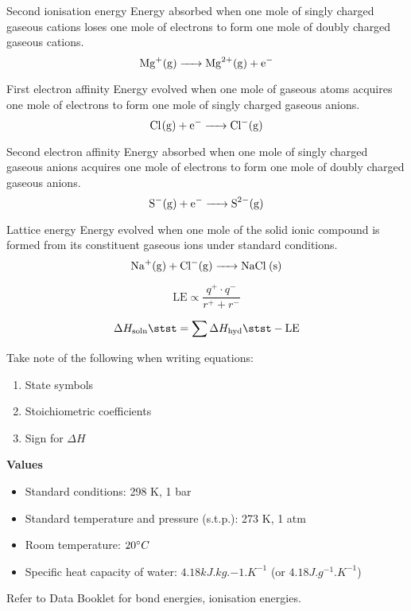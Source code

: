 \begin{defn}{Second ionisation energy}{}
Energy absorbed when one mole of singly charged gaseous cations loses one mole of electrons to form one mole of doubly charged gaseous cations.
\[ \ce{Mg^+(g) -> Mg^2+(g) + e^-} \]
\end{defn}

\begin{defn}{First electron affinity}{}
Energy evolved when one mole of gaseous atoms acquires one mole of electrons to form one mole of singly charged gaseous anions.
\[ \ce{Cl(g) + e^- -> Cl^-(g)} \]
\end{defn}

\begin{defn}{Second electron affinity}{}
Energy absorbed when one mole of singly charged gaseous anions acquires one mole of electrons to form one mole of doubly charged gaseous anions.
\[ \ce{S^-(g) + e^- -> S^2-(g)} \]
\end{defn}

\begin{defn}{Lattice energy}{}
Energy evolved when one mole of the solid ionic compound is formed from its constituent gaseous ions under standard conditions.
\[ \ce{Na^+(g) + Cl^-(g) -> NaCl (s)} \]
\end{defn}

\begin{equation}
\text{LE}\propto\frac{q^+\cdot q^-}{r^++r^-}
\end{equation}

\begin{equation}
\Delta H_\text{soln}\stst=\sum\Delta H_\text{hyd}\stst-\text{LE}
\end{equation}

\begin{remark}
Take note of the following when writing equations:
\begin{enumerate}
\item State symbols
\item Stoichiometric coefficients
\item Sign for $\Delta H$
\end{enumerate}
\end{remark}

\begin{ebox}
\textbf{Values}
\begin{itemize}
\item Standard conditions: 298 K, 1 bar 
\item Standard temperature and pressure (s.t.p.): 273 K, 1 atm
\item Room temperature: $20\degree C$
\item Specific heat capacity of water: $4.18 \unit{kJ.kg.{-1}.K^{-1}}$ (or $4.18 \unit{J.g^{-1}.K^{-1}}$)
\end{itemize}
Refer to Data Booklet for bond energies, ionisation energies.
\end{ebox}

